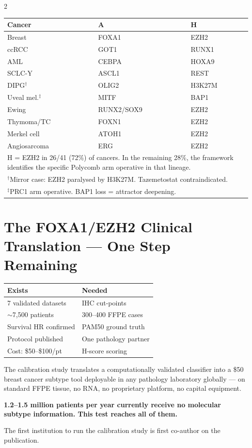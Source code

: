 \documentclass[9.5pt, a4paper]{article}
\begin{document}
\begin{multicols}{2}
{\small
\begin{tabular}{p{1.6cm}p{1.9cm}p{1.7cm}}
\toprule
\textbf{Cancer} &
\textbf{A} &
\textbf{H} \\
\midrule
Breast & FOXA1 & EZH2 \\
ccRCC & GOT1 & RUNX1 \\
AML & CEBPA & HOXA9 \\
SCLC-Y & ASCL1 & REST \\
DIPG$^\dagger$ & OLIG2 & H3K27M \\
Uveal mel.$^\ddagger$ & MITF & BAP1 \\
Ewing & RUNX2/SOX9 & EZH2 \\
Thymoma/TC & FOXN1 & EZH2 \\
Merkel cell & ATOH1 & EZH2 \\
Angiosarcoma & ERG & EZH2 \\
\midrule
\multicolumn{3}{p{5.4cm}}{
\footnotesize
H = EZH2 in 26/41 (72\%) of cancers.
In the remaining 28\%, the framework
identifies the specific Polycomb arm
operative in that lineage.}\\[0.15em]
\multicolumn{3}{p{5.4cm}}{
\footnotesize
$^\dagger$Mirror case: EZH2 paralysed
by H3K27M. Tazemetostat
contraindicated.}\\[0.1em]
\multicolumn{3}{p{5.4cm}}{
\footnotesize
$^\ddagger$PRC1 arm operative.
BAP1 loss = attractor deepening.}\\
\bottomrule
\end{tabular}
}

\section{The FOXA1/EZH2 Clinical
Translation — One Step Remaining}

{\small
\begin{tabular}{p{2.7cm}p{2.7cm}}
\textbf{Exists} & \textbf{Needed} \\
\midrule
7 validated datasets & IHC cut-points \\
$\sim$7,500 patients & 300--400 FFPE cases \\
Survival HR confirmed & PAM50 ground truth \\
Protocol published & One pathology partner \\
Cost: \$50--\$100/pt & H-score scoring \\
\end{tabular}
}

\smallskip
{\small
The calibration study translates a
computationally validated classifier
into a \$50 breast cancer subtype tool
deployable in any pathology laboratory
globally — on standard FFPE tissue,
no RNA, no proprietary platform,
no capital equipment.

\textbf{1.2--1.5 million patients per year
currently receive no molecular subtype
information. This test reaches all of them.}

The first institution to run the
calibration study is first co-author
on the publication.
}

\end{multicols}
\end{document}
